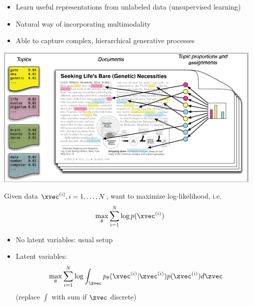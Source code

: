 \begin{frame}
  \begin{center}
   \end{center}
\begin{itemize}
\item Learn useful representations from unlabeled data (unsupervised learning)
\item Natural way of incorporating multimodality
\item Able to capture complex, hierarchical generative processes
\end{itemize}
\end{frame}

\begin{frame}
  \begin{center}
   \end{center}
   \center
\includegraphics[scale=0.5]{lda}
\end{frame}

\begin{frame}
  \begin{center}
   \end{center}
 Given data $\xvec^{(i)}, i = 1, \dots, N$, want to maximize log-likelihood, i.e.
 \[ \max_\theta \sum_{i=1}^N \log p(\xvec^{(i)})\]
\begin{itemize}
\item No latent variables: usual setup
\item Latent variables:
\[ \max_\theta \sum_{i=1}^N \log \int_\zvec p_\theta(\xvec^{(i)} | \zvec^{(i)})p(\zvec^{(i)}) d\zvec \]
(replace $\int$ with sum if $\zvec$ discrete)
\end{itemize}
\end{frame}

